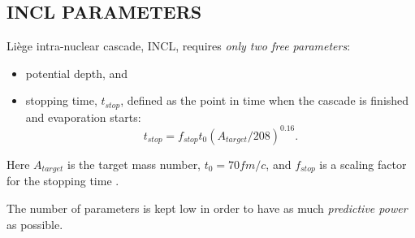\documentclass[20pt]{article}
\newenvironment{textbox}
{\begin{lrbox}{\dummybox}\begin{minipage}{0.9\columnwidth}}
{\end{minipage}\end{lrbox}\raisebox{-\depth}{\psshadowbox[framesep=1em,framearc=.1,shadow=true]{\usebox{\dummybox}}}\vspace{0.005\textheight}}
\begin{document}
\begin{center}
\begin{multicols}{3}
\begin{textbox}

\section*{{\Huge {\sf INCL PARAMETERS}}}
{\color{udsect}
Li\`ege intra-nuclear cascade, {\sf INCL}, \cite{incl} requires \emph{only two free parameters}:
\begin{itemize}
\item potential depth, and
\item stopping time, $t_{stop}$, defined as the point in time when the cascade is
finished and evaporation starts:
\begin{equation}
t_{stop} = f_{stop}t_0 (A_{target}/208) ^{0.16}.
\end{equation}
\end{itemize}
Here $A_{target}$ is the target mass number, $t_0 = 70 fm/c$, and
$f_{stop}$ is a scaling factor for the stopping time \cite{g4incl}.
\vskip0.5cm

The number of parameters is kept low in order to have as much
\emph{predictive power} as possible.
}

\end{textbox}









\end{multicols}
\end{center}
\end{document}
